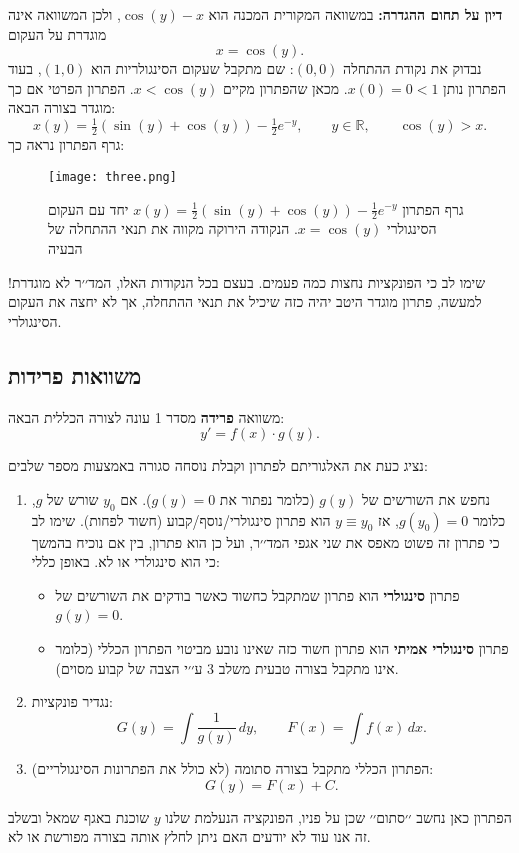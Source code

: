 \documentclass{article}
\numberwithin{equation}{section}
\begin{document}
\textbf{דיון על תחום ההגדרה:}  
במשוואה המקורית המכנה הוא $\cos(y)-x$, ולכן המשוואה אינה מוגדרת על העקום
\[
x = \cos(y).
\]
נבדוק את נקודת ההתחלה $(0,0)$: שם מתקבל שעקום הסינגולריות הוא $(1,0)$, 
בעוד הפתרון נותן $x(0)=0 < 1$.  
מכאן שהפתרון מקיים $x<\cos(y)$. הפתרון הפרטי אם כך מוגדר בצורה הבאה:
\[
\boxed{\, x(y) = \tfrac{1}{2}(\sin(y)+\cos(y)) - \tfrac{1}{2} e^{-y}, \qquad y\in\mathbb{R} ,\qquad \cos(y) > x. \,}
\]
גרף הפתרון נראה כך:
\begin{figure}[H]
    \centering
    \texttt{[image: three.png]}
    \caption{גרף הפתרון $x(y)=\tfrac{1}{2}(\sin(y)+\cos(y))-\tfrac{1}{2}e^{-y}$ 
    יחד עם העקום הסינגולרי $x=\cos(y)$. הנקודה הירוקה מקווה את תנאי ההתחלה של הבעיה}
    \label{fig:cos_case}
\end{figure}
שימו לב כי הפונקציות נחצות כמה פעמים. בעצם בכל הנקודות האלו, המד׳׳ר לא מוגדרת! למעשה, פתרון מוגדר היטב יהיה כזה שיכיל את תנאי ההתחלה, אך לא יחצה את העקום הסינגולרי.

\newpage
\subsection{משוואות פרידות}

משוואה \textbf{פרידה} מסדר 1 עונה לצורה הכללית הבאה:
\begin{equation}
y' = f(x)\cdot g(y).
\end{equation}

נציג כעת את האלגוריתם לפתרון וקבלת נוסחה סגורה באמצעות מספר שלבים:
\begin{enumerate}
  \item נחפש את השורשים של $g(y)$ (כלומר נפתור את $g(y)=0$). 
  אם $y_0$ שורש של $g$, כלומר $g(y_0)=0$, אז $y \equiv y_0$ הוא פתרון סינגולרי/נוסף/קבוע (חשוד לפחות). שימו לב כי פתרון זה פשוט מאפס את שני אגפי המד׳׳ר, ועל כן הוא פתרון, בין אם נוכיח בהמשך כי הוא סינגולרי או לא.
  באופן כללי:  
\begin{itemize}
  \item[] פתרון \textbf{ סינגולרי} הוא פתרון שמתקבל כחשוד כאשר בודקים את השורשים של $g(y)=0$.
  \item[] פתרון \textbf{סינגולרי אמיתי} הוא פתרון חשוד כזה שאינו נובע מביטוי הפתרון הכללי (כלומר אינו מתקבל בצורה טבעית משלב 3 ע׳׳י הצבה של קבוע מסוים).
\end{itemize}
  \item נגדיר פונקציות:
  \[
  G(y) = \int \frac{1}{g(y)}\,dy, 
  \qquad 
  F(x) = \int f(x)\,dx.
  \]
  \item הפתרון הכללי מתקבל בצורה סתומה (לא כולל את הפתרונות הסינגולריים):
  \begin{equation}
  G(y) = F(x) + C.
  \end{equation}
\end{enumerate}
הפתרון כאן נחשב ׳׳סתום׳׳ שכן על פניו, הפונקציה הנעלמת שלנו $y$ שוכנת באגף שמאל ובשלב זה אנו עוד לא יודעים האם ניתן לחלץ אותה בצורה מפורשת או לא. 
\vspace{0.5cm}
\end{document}
